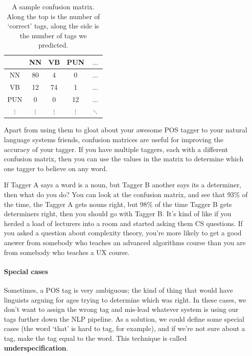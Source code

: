 \begin{table}[h]
  \centering
  \begin{tabular}{|c|c|c|c|c|}
    \hline
        & NN  & VB  & PUN & $\dots$\\ \hline
    NN  & 80  & 4   & 0   & $\dots$\\ \hline
    VB  & 12  & 74  & 1   & $\dots$\\ \hline
    PUN & 0   & 0   & 12  & $\dots$\\ \hline
    $\vdots$ & $\vdots$ & $\vdots$ & $\vdots$ & $\ddots$\\ \hline
  \end{tabular}
  \caption{A sample confusion matrix. Along the top is the number of `correct' 
  tags, along the side is the number of tags we predicted.}
  \label{table:conf-matrix}
\end{table}

Apart from using them to gloat about your awesome POS tagger to your natural
language systems friends, confusion matrices are useful for improving the
accuracy of your tagger. If you have multiple taggers, each with a different
confusion matrix, then you can use the values in the matrix to determine which
one tagger to believe on any word.

If Tagger A says a word is a noun, but Tagger B another says its a determiner,
then what do you do? You can look at the confusion matrix, and see that $93\%$
of the time, the Tagger A gets nouns right, but $98\%$ of the time Tagger B gets
determiners right, then you should go with Tagger B. It's kind of like if you
herded a load of lecturers into a room and started asking them CS questions. If
you asked a question about complexity theory, you're more likely to get a good
answer from somebody who teaches an advanced algorithms course than you are from
somebody who teaches a UX course.


\paragraph{Special cases} Sometimes, a POS tag is very ambiguous; the kind of
thing that would have linguists arguing for ages trying to determine which was
right. In these cases, we don't want to assign the wrong tag and mis-lead
whatever system is using our tags further down the NLP pipeline. As a solution,
we could define some special cases (the word `that' is hard to tag, for
example), and if we're not sure about a tag, make the tag equal to the word.
This technique is called \textbf{underspecification}.

